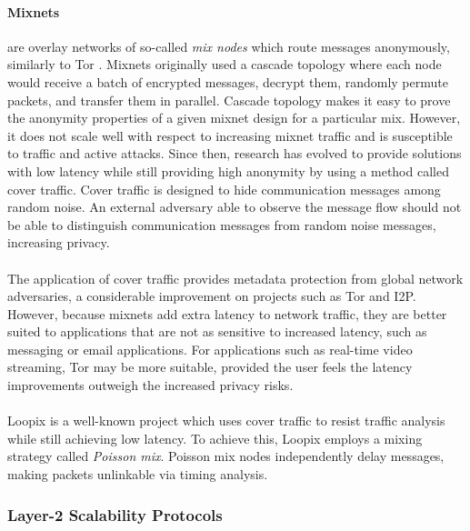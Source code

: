 \paragraph{Mixnets} are overlay networks of so-called \textit{mix nodes} which
route messages anonymously, similarly to Tor \cite{mixnets}. Mixnets originally
used a cascade topology where each node would receive a batch of encrypted messages,
decrypt them, randomly permute packets, and transfer them in parallel. Cascade
topology makes it easy to prove the anonymity properties of a given mixnet
design for a particular mix. However, it does not scale well with respect to
increasing mixnet traffic and is susceptible to traffic and active attacks.
Since then, research has evolved to provide solutions with low latency while
still providing high anonymity by using a method called cover traffic. Cover
traffic is designed to hide communication messages among random noise. An
external adversary able to observe the message flow should not be able to
distinguish communication messages from random noise messages, increasing
privacy.
\\~\\The application of cover traffic provides metadata protection from global network adversaries, a considerable improvement on projects such as Tor and I2P.
However, because mixnets add extra latency to network traffic, they are better suited to
applications that are not as sensitive to increased latency, such as messaging
or email applications. For applications such as real-time video streaming, Tor may be more suitable, provided the user feels the latency improvements outweigh the increased privacy risks.
\\~\\Loopix \cite{loopix} is a well-known project which uses cover traffic to
resist traffic analysis while still achieving low latency. To achieve this, Loopix
employs a mixing strategy called \textit{Poisson mix}. Poisson mix nodes
independently delay messages, making packets unlinkable via timing analysis.


\subsubsection{Layer-2 Scalability Protocols}
\label{sec:l2protocols}

